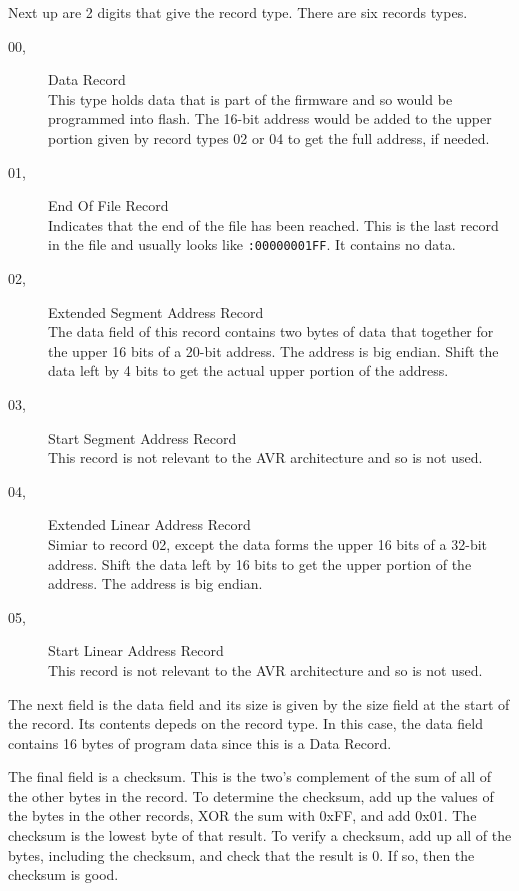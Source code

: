 \documentclass{article}
\begin{document}
Next up are 2 digits that give the record type.  There are six records types.

\begin{description}
  \item[00,] Data Record \\
    This type holds data that is part of the firmware and so would be programmed into flash.  The
    16-bit address would be added to the upper portion given by record types 02 or 04 to get the
    full address, if needed.
  \item[01,] End Of File Record \\
    Indicates that the end of the file has been reached.  This is the last record in the file and
    usually looks like \texttt{:00000001FF}.  It contains no data.
  \item[02,] Extended Segment Address Record \\
    The data field of this record contains two bytes of data that together for the upper 16 bits of
    a 20-bit address.  The address is big endian.  Shift the data left by 4 bits to get the actual
    upper portion of the address.
  \item[03,] Start Segment Address Record \\
    This record is not relevant to the AVR architecture and so is not used.
  \item[04,] Extended Linear Address Record \\
    Simiar to record 02, except the data forms the upper 16 bits of a 32-bit address.  Shift the
    data left by 16 bits to get the upper portion of the address.  The address is big endian.
  \item[05,] Start Linear Address Record \\
    This record is not relevant to the AVR architecture and so is not used.
\end{description}

The next field is the data field and its size is given by the size field at the start of the
record.  Its contents depeds on the record type.  In this case, the data field contains 16 bytes of
program data since this is a Data Record.

The final field is a checksum.  This is the two's complement of the sum of all of the other bytes in
the record.  To determine the checksum, add up the values of the bytes in the other records, XOR the
sum with 0xFF, and add 0x01.  The checksum is the lowest byte of that result.  To verify a checksum,
add up all of the bytes, including the checksum, and check that the result is 0.  If so, then the
checksum is good.
\end{document}

